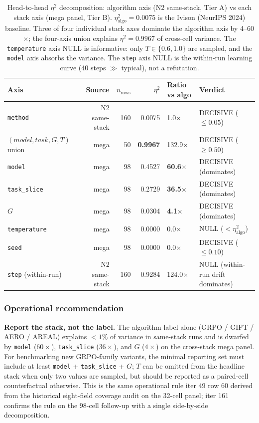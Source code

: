 \documentclass{article}  \usepackage[preprint,nonatbib]{neurips_2026} \usepackage[numbers]{natbib}
\begin{document}
\begin{table}[ht]
\centering\small
\begin{tabular}{lrrrll}
\toprule
Axis & Source & $n_{\mathrm{rows}}$ & $\eta^2$ & Ratio vs algo & Verdict \\
\midrule
\texttt{method}     & N2 same-stack       & 160 & 0.0075 & 1.0$\times$  & DECISIVE ($\leq 0.05$) \\
$(model, task, G, T)$ union & mega & 50 & \textbf{0.9967} & 132.9$\times$ & DECISIVE ($\geq 0.50$) \\
\texttt{model}      & mega                & 98 & 0.4527 & \textbf{60.6$\times$} & DECISIVE (dominates) \\
\texttt{task\_slice}& mega                & 98 & 0.2729 & \textbf{36.5$\times$} & DECISIVE (dominates) \\
$G$                 & mega                & 98 & 0.0304 & \textbf{4.1$\times$}  & DECISIVE (dominates) \\
\texttt{temperature}& mega                & 98 & 0.0000 & 0.0$\times$  & NULL ($< \eta^2_{\mathrm{algo}}$) \\
\texttt{seed}       & mega                & 98 & 0.0000 & 0.0$\times$  & DECISIVE ($\leq 0.10$) \\
\texttt{step} (within-run) & N2 same-stack & 160 & 0.9284 & 124.0$\times$ & NULL (within-run drift dominates) \\
\bottomrule
\end{tabular}
\caption{Head-to-head $\eta^2$ decomposition: algorithm axis (N2 same-stack,
Tier A) vs each stack axis (mega panel, Tier B). $\eta^2_{\mathrm{algo}} =
0.0075$ is the Ivison (NeurIPS 2024) baseline. Three of four individual
stack axes dominate the algorithm axis by 4--60$\times$; the four-axis
union explains $\eta^2 = 0.9967$ of cross-cell variance. The
\texttt{temperature} axis NULL is informative: only $T \in \{0.6, 1.0\}$
are sampled, and the \texttt{model} axis absorbs the variance. The
\texttt{step} axis NULL is the within-run learning curve (40 steps
$\gg$ typical), not a refutation.}
\label{tab:p5-iter161-head-to-head}
\end{table}

\subsubsection{Operational recommendation}
\label{sec:p5-iter161-recommendation}
\textbf{Report the stack, not the label.} The algorithm label alone
(GRPO / GIFT / AERO / AREAL) explains $<1\%$ of variance in same-stack
runs and is dwarfed by \texttt{model} ($60\times$), \texttt{task\_slice}
($36\times$), and $G$ ($4\times$) on the cross-stack mega panel.
For benchmarking new GRPO-family variants, the minimal reporting set
must include at least \texttt{model} + \texttt{task\_slice} + $G$;
$T$ can be omitted from the headline stack when only two values are
sampled, but should be reported as a paired-cell counterfactual
otherwise. This is the same operational rule iter 49 row 60 derived
from the historical eight-field coverage audit on the 32-cell panel; iter
161 confirms the rule on the 98-cell follow-up with a single
side-by-side decomposition.
\end{document}
